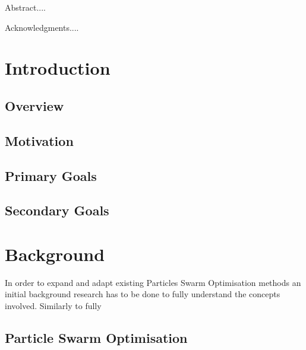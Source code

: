 \documentclass{pdfmx4020}
\begin{document}
\newfrontpage


\begin{Abstract}
Abstract....
\end{Abstract}

\begin{Acknowledgments}
Acknowledgments....
\end{Acknowledgments}

\StartThesis

\chapter{Introduction}
  \section{Overview} %
  \label{sec:overview}
  

  \section{Motivation} %
  \label{sec:motivation}

  \section{Primary Goals} %
  \label{sec:primary_goals}
  

  \section{Secondary Goals} %
  \label{sec:secondary_goals}
  

\chapter{Background}
  In order to expand and adapt existing Particles Swarm Optimisation methods an initial background research has to be done to fully understand the concepts involved. Similarly to fully 

  \section{Particle Swarm Optimisation} %
  \label{sec:particle_swarm_optimisation}
\end{document}
